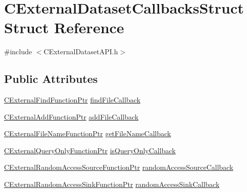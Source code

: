 \hypertarget{structCExternalDatasetCallbacksStruct}{
\section{CExternalDatasetCallbacksStruct Struct Reference}
\label{structCExternalDatasetCallbacksStruct}
}


{\ttfamily \#include $<$CExternalDatasetAPI.h$>$}\subsection*{Public Attributes}
\begin{DoxyCompactItemize}
\item 
\hyperlink{CExternalDatasetAPI_8h_a250a18d32e0c29e4f2f08ab908d32775}{CExternalFindFunctionPtr} \hyperlink{structCExternalDatasetCallbacksStruct_a0dfdebc4d94f7001e5a0d897b7e724e0}{findFileCallback}
\item 
\hyperlink{CExternalDatasetAPI_8h_a53860bc67bbe6dca6cd05d2a4b80b016}{CExternalAddFunctionPtr} \hyperlink{structCExternalDatasetCallbacksStruct_a2360736a89fadf688b4e2a4f55061fb7}{addFileCallback}
\item 
\hyperlink{CExternalDatasetAPI_8h_aaf98421d8691ec968a5b20cfcbf102c4}{CExternalFileNameFunctionPtr} \hyperlink{structCExternalDatasetCallbacksStruct_a75464d1f102166a7169c956a0da93edd}{getFileNameCallback}
\item 
\hyperlink{CExternalDatasetAPI_8h_aba89a534569a57108871cdffeed3850d}{CExternalQueryOnlyFunctionPtr} \hyperlink{structCExternalDatasetCallbacksStruct_a1fc1a36f177ee26b40a9ac4148fa2545}{isQueryOnlyCallback}
\item 
\hyperlink{CExternalDatasetAPI_8h_afb9abfd5c7b47529af07724f1497a212}{CExternalRandomAccessSourceFunctionPtr} \hyperlink{structCExternalDatasetCallbacksStruct_af17a6cb4f56e557021adbe64a0478fdd}{randomAccessSourceCallback}
\item 
\hyperlink{CExternalDatasetAPI_8h_a2ae9fe654d2144567260853e62de03ee}{CExternalRandomAccessSinkFunctionPtr} \hyperlink{structCExternalDatasetCallbacksStruct_aa3b705a806256dba13eaa4ad3dc9dcc7}{randomAccessSinkCallback}
\end{DoxyCompactItemize}


